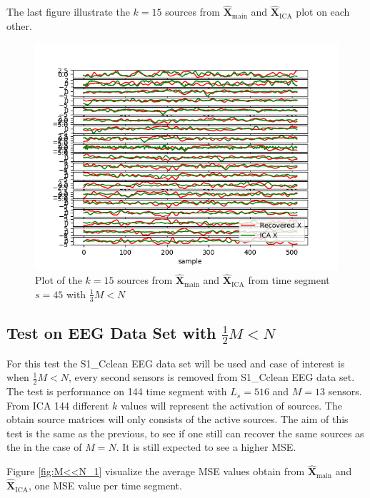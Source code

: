 The last figure illustrate the $k = 15$ sources from $\hat{\mathbf{X}}_{\text{main}}$ and $\hat{\mathbf{X}}_{\text{ICA}}$ plot on each other.
\begin{figure}[H]
    \centering
	\includegraphics[scale=0.5]{figures/ch_7/Sources_3M_N.png}
	\caption{Plot of the $k = 15$ sources from $\hat{\mathbf{X}}_{\text{main}}$ and $\hat{\mathbf{X}}_{\text{ICA}}$ from time segment $s = 45$ with $\frac{1}{3} M<N$}
	\label{fig:M<N_3}
\end{figure} 
\noindent

\subsection{Test on EEG Data Set with $\frac{1}{2} M<N$}
For this test the S1\_Cclean EEG data set will be used and case of interest is when $\frac{1}{2} M < N$, every second sensors is removed from S1\_Cclean EEG data set. The test is performance on 144 time segment with $L_s = 516$ and $M = 13$ sensors. From ICA 144 different $k$ values will represent the activation of sources. The obtain source matrices will only consists of the active sources.
The aim of this test is the same as the previous, to see if one still can recover the same sources as the in the case of $M=N$. It is still expected to see a higher MSE.

Figure \ref{fig:M<<N_1} visualize the average MSE values obtain from $\hat{\mathbf{X}}_{\text{main}}$ and $\hat{\mathbf{X}}_{\text{ICA}}$, one MSE value per time segment.

